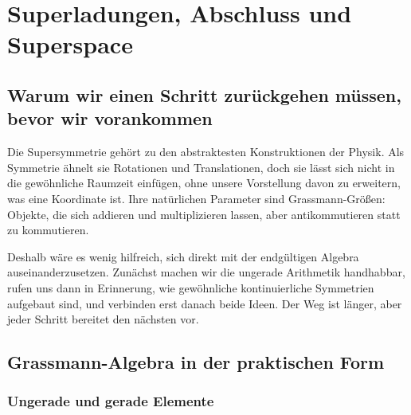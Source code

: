 \chapter{Superladungen, Abschluss und Superspace}


\section{Warum wir einen Schritt zurückgehen müssen, bevor wir vorankommen}

Die Supersymmetrie gehört zu den abstraktesten Konstruktionen der Physik. Als Symmetrie ähnelt sie Rotationen und Translationen, doch sie lässt sich nicht in die gewöhnliche Raumzeit einfügen, ohne unsere Vorstellung davon zu erweitern, was eine Koordinate ist. Ihre natürlichen Parameter sind Grassmann-Größen: Objekte, die sich addieren und multiplizieren lassen, aber antikommutieren statt zu kommutieren.

Deshalb wäre es wenig hilfreich, sich direkt mit der endgültigen Algebra auseinanderzusetzen. Zunächst machen wir die ungerade Arithmetik handhabbar, rufen uns dann in Erinnerung, wie gewöhnliche kontinuierliche Symmetrien aufgebaut sind, und verbinden erst danach beide Ideen. Der Weg ist länger, aber jeder Schritt bereitet den nächsten vor.

\section{Grassmann-Algebra in der praktischen Form}

\subsection{Ungerade und gerade Elemente}

